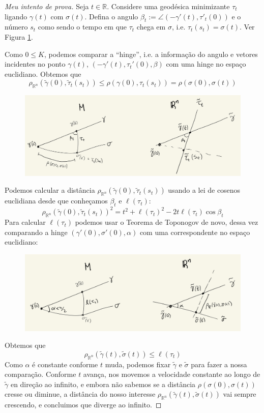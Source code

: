 \begin{proof}[Meu intento de prova]
Seja $t \in \mathbb{R}$. Considere uma geodésica minimizante $\tau_t$ ligando
$\gamma(t)$ com $\sigma(t)$. Defina o angulo 
$\beta_t:=\angle(-\gamma'(t),\tau'_t(0))$ e o número $s_t$ como sendo o tempo em que
$\tau_t$ chega em $\sigma$, i.e. $\tau_t(s_t)=\sigma(t)$. Ver Figura
\ref{figure-toponogov-exercise}.

Como $0 \leq  K$, podemos comparar a ``hinge'',
i.e. a informação do angulo e vetores incidentes no ponto $\gamma(t)$, 
$(-\gamma'(t),\tau_t'(0),\beta)$ com uma hinge no espaço
euclidiano. Obtemos que 
$$
\rho_{\mathbb{R}^n}(\tilde{\gamma}(0),\tilde{\tau}_t(s_t))\leq
\rho(\gamma(0),\tau_t(s_t))=\rho(\sigma(0),\sigma(t))
$$
\begin{figure}[H]
\includegraphics[width=1\textwidth]{figures/toponogov-exercise}
\caption{}
\label{figure-toponogov-exercise}
\end{figure}
Podemos calcular a distância
$\rho_{\mathbb{R}^n}(\tilde{\gamma}(0),\tilde{\tau}_t(s_t))$ usando a lei de
cosenos euclidiana desde que conheçamos $\beta_t$ e $\ell(\tau_t)$:
$$
\rho_{\mathbb{R}^n}(\tilde{\gamma}(0),\tilde{\tau}_t(s_t))^2=
t^2+\ell(\tau_t)^2-2t\ell(\tau_t)\cos \beta_t
$$
Para calcular $\ell(\tau_t)$ podemos usar o Teorema de Toponogov de novo, dessa
vez comparando a hinge $(\gamma'(0), \sigma'(0),\alpha)$ com uma correspondente
no espaço euclidiano:
\begin{figure}[H]
\centering
\includegraphics[width=1\textwidth]{figures/toponogov-exercise2}
\label{figure-toponogov-exercise2}
\end{figure}
Obtemos que
$$
\rho_{\mathbb{R}^n}(\tilde{\gamma}(t),\tilde{\sigma}(t))\leq \ell(\tau_t)
$$
Como $\alpha$ é constante conforme $t$ muda, podemos fixar $\tilde{\gamma}$ e
$\tilde{\sigma}$ para fazer a nossa comparação. Conforme  $t$ avança, nos
movemos a velocidade constante ao longo de $\tilde{\gamma}$ en direção ao
infinito, e embora não sabemos se a distância $\rho(\sigma(0),\sigma(t))$ cresse
 ou diminue, a distância do nosso interesse 
$\rho_{\mathbb{R}^n}(\tilde{\gamma}(t),\tilde{\sigma}(t))$
vai sempre crescendo, e concluimos que diverge ao infinito.


\end{proof}
